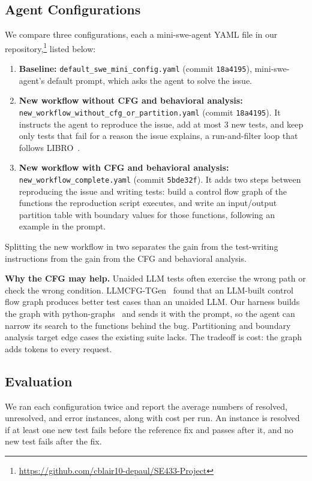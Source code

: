\documentclass[conference]{IEEEtran}
\begin{document}
\subsection{Agent Configurations}
We compare three configurations, each a mini-swe-agent YAML file in our repository,\footnote{\url{https://github.com/cblair10-depaul/SE433-Project}} listed below:
\begin{enumerate}
  \item \textbf{Baseline:} \texttt{default\_swe\_mini\_config.yaml} (commit \texttt{18a4195}), mini-swe-agent's default prompt, which asks the agent to solve the issue.
  \item \textbf{New workflow without CFG and behavioral analysis:} \texttt{new\_\allowbreak workflow\_\allowbreak without\_\allowbreak cfg\_\allowbreak or\_\allowbreak partition.yaml} (commit \texttt{18a4195}). It instructs the agent to reproduce the issue, add at most 3 new tests, and keep only tests that fail for a reason the issue explains, a run-and-filter loop that follows LIBRO~\cite{libro}.
  \item \textbf{New workflow with CFG and behavioral analysis:} \texttt{new\_workflow\_complete.yaml} (commit \texttt{5bde32f}). It adds two steps between reproducing the issue and writing tests: build a control flow graph of the functions the reproduction script executes, and write an input/output partition table with boundary values for those functions, following an example in the prompt.
\end{enumerate}
Splitting the new workflow in two separates the gain from the test-writing instructions from the gain from the CFG and behavioral analysis.

\textbf{Why the CFG may help.} Unaided LLM tests often exercise the wrong path or check the wrong condition. LLMCFG-TGen~\cite{llmcfgtgen} found that an LLM-built control flow graph produces better test cases than an unaided LLM. Our harness builds the graph with python-graphs~\cite{pythongraphs,bieber2020} and sends it with the prompt, so the agent can narrow its search to the functions behind the bug. Partitioning and boundary analysis target edge cases the existing suite lacks. The tradeoff is cost: the graph adds tokens to every request.

\subsection{Evaluation}
We ran each configuration twice and report the average numbers of resolved, unresolved, and error instances, along with cost per run. An instance is resolved if at least one new test fails before the reference fix and passes after it, and no new test fails after the fix.
\end{document}
